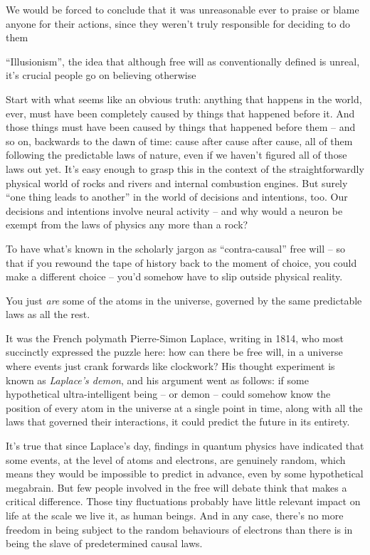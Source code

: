 \documentclass[
]{book}
\begin{document}
We would be forced to conclude that it was unreasonable ever to praise or blame anyone for their actions, since they weren't truly responsible for deciding to do them

``Illusionism'', the idea that although free will as conventionally defined is unreal, it's crucial people go on believing otherwise

Start with what seems like an obvious truth: anything that happens in the world, ever, must have been completely caused by things that happened before it. And those things must have been caused by things that happened before them -- and so on, backwards to the dawn of time: cause after cause after cause, all of them following the predictable laws of nature, even if we haven't figured all of those laws out yet. It's easy enough to grasp this in the context of the straightforwardly physical world of rocks and rivers and internal combustion engines. But surely ``one thing leads to another'' in the world of decisions and intentions, too. Our decisions and intentions involve neural activity -- and why would a neuron be exempt from the laws of physics any more than a rock?

To have what's known in the scholarly jargon as ``contra-causal'' free will -- so that if you rewound the tape of history back to the moment of choice, you could make a different choice -- you'd somehow have to slip outside physical reality.

You just \emph{are} some of the atoms in the universe, governed by the same predictable laws as all the rest.

It was the French polymath Pierre-Simon Laplace, writing in 1814, who most succinctly expressed the puzzle here: how can there be free will, in a universe where events just crank forwards like clockwork? His thought experiment is known as \emph{Laplace's demon}, and his argument went as follows: if some hypothetical ultra-intelligent being -- or demon -- could somehow know the position of every atom in the universe at a single point in time, along with all the laws that governed their interactions, it could predict the future in its entirety.

It's true that since Laplace's day, findings in quantum physics have indicated that some events, at the level of atoms and electrons, are genuinely random, which means they would be impossible to predict in advance, even by some hypothetical megabrain. But few people involved in the free will debate think that makes a critical difference. Those tiny fluctuations probably have little relevant impact on life at the scale we live it, as human beings. And in any case, there's no more freedom in being subject to the random behaviours of electrons than there is in being the slave of predetermined causal laws.
\end{document}

